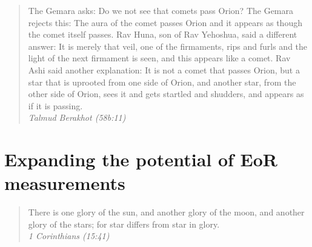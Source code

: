 \documentclass[12pt,twoside,openany]{book}
\begin{document}
\vspace*{\fill} 
\begin{quote} 
\centering 
The Gemara asks: Do we not see that comets pass Orion? The Gemara rejects this: The aura of the comet passes Orion and it appears as though the comet itself passes. Rav Huna, son of Rav Yehoshua, said a different answer: It is merely that veil, one of the firmaments, rips and furls and the light of the next firmament is seen, and this appears like a comet. Rav Ashi said another explanation: It is not a comet that passes Orion, but a star that is uprooted from one side of Orion, and another star, from the other side of Orion, sees it and gets startled and shudders, and appears as if it is passing.\\

\textit{Talmud Berakhot (58b:11)}
\end{quote}
\vspace*{\fill}


%
%
%

%
%
%

%
%

% 
%

%
%
%

%
%
%
%
%
\part{Expanding the potential of EoR measurements}


\vspace*{\fill} 
\begin{quote} 
\centering 
There is one glory of the sun, and another glory of the moon, and another glory of the stars; for star differs from star in glory. \\
\textit{1 Corinthians (15:41)}
\end{quote}
\vspace*{\fill}
\end{document}
